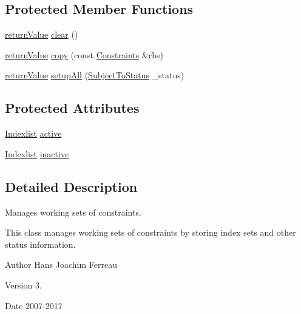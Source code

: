 \subsection*{Protected Member Functions}
\begin{DoxyCompactItemize}
\item 
\hyperlink{_message_handling_8hpp_a81d556f613bfbabd0b1f9488c0fa865e}{return\+Value} \hyperlink{class_constraints_a945b4c8e40f28c3a2a56c8aabe3a6d5d}{clear} ()
\item 
\hyperlink{_message_handling_8hpp_a81d556f613bfbabd0b1f9488c0fa865e}{return\+Value} \hyperlink{class_constraints_aecbc863137db2de818bbd8c365027d2b}{copy} (const \hyperlink{class_constraints}{Constraints} \&rhs)
\item 
\hyperlink{_message_handling_8hpp_a81d556f613bfbabd0b1f9488c0fa865e}{return\+Value} \hyperlink{class_constraints_aeeee62fed6ea53444f370f6d4e3596d6}{setup\+All} (\hyperlink{_types_8hpp_a70a6a40d261a015ead8d43aa589383a4}{Subject\+To\+Status} \+\_\+status)
\end{DoxyCompactItemize}
\subsection*{Protected Attributes}
\begin{DoxyCompactItemize}
\item 
\hyperlink{class_indexlist}{Indexlist} \hyperlink{class_constraints_a2fdcb864fec70473725bde4667d7923a}{active}
\item 
\hyperlink{class_indexlist}{Indexlist} \hyperlink{class_constraints_a4679ab5910823e575bb70ccd1c08fd25}{inactive}
\end{DoxyCompactItemize}


\subsection{Detailed Description}
Manages working sets of constraints. 

This class manages working sets of constraints by storing index sets and other status information.

\begin{DoxyAuthor}{Author}
Hans Joachim Ferreau 
\end{DoxyAuthor}
\begin{DoxyVersion}{Version}
3. 
\end{DoxyVersion}
\begin{DoxyDate}{Date}
2007-\/2017 
\end{DoxyDate}


